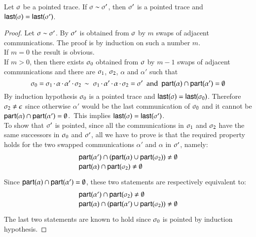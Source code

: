 \begin{lemma}
Let $\sigma$ be a pointed  trace.  If  $\sigma \sim \sigma'$, then $\sigma'$ is a
 pointed  trace   and ${\sf last}(\sigma)={\sf last}(\sigma')$.  
\end{lemma}
\begin{proof}
  Let $\sigma \sim \sigma'$. By  $\sigma'$ is
  obtained from $\sigma$ by $m$ swaps of adjacent communications. The
  proof is by induction on such a number 
 $m$. \\
  If $m=0$ the result is obvious.\\
  If $m>0$, then there exists $\sigma_0$ obtained from $\sigma$ by
  $m-1$ swaps of adjacent communications and there are  
$\sigma_1$,  $\sigma_2$,  $\alpha$ and $\alpha'$ such that
\[
  \sigma_0 =
    \sigma_1\,{\cdot}\,\alpha\,{\cdot}\,\alpha'\,{\cdot}\,\sigma_2\,\sim\,\,
    \sigma_1\,{\cdot}\,\alpha'\,{\cdot}\,\alpha\,{\cdot}\,\sigma_2
    = \sigma'\ \ \mbox{and}\
    \ {\sf part}(\alpha)\cap{\sf part}(\alpha')=\emptyset
    \]
   By
  induction hypothesis $\sigma_0$ is a pointed  trace  
  and ${\sf last}(\sigma)={\sf last}(\sigma_0)$.  Therefore
  $\sigma_2\neq\epsilon$ since otherwise $\alpha'$ would be the
  last communication of $\sigma_0$ and it cannot be
  ${\sf part}(\alpha)\cap {\sf part}(\alpha')=\emptyset$.\
  This implies ${\sf last}(\sigma)={\sf last}(\sigma')$.\\
  To show that $\sigma'$ is pointed, since all the communications in
  $\sigma_1$ and $\sigma_2$ have the same successors in
  $\sigma_0$ and $\sigma'$, all we have to prove is  that the
  required property holds for the two swapped communications
  $\alpha'$ and $\alpha$ in $\sigma'$, namely:
\[
\begin{array}{l}
 {\sf part}(\alpha')\cap({\sf part}(\alpha)\cup{\sf part}(\sigma_2))\not=\emptyset\\[2pt]
 {\sf part}(\alpha)\cap{\sf part}(\sigma_2)\not=\emptyset\\[2pt]
\end{array}
\]
Since ${\sf part}(\alpha)\cap{\sf part}(\alpha')=\emptyset$, these
two statements are respectively equivalent to:
\[
\begin{array}{l}
{\sf part}(\alpha')\cap{\sf part}(\sigma_2)\not=\emptyset \\[2pt]
{\sf part}(\alpha)\cap({\sf part}(\alpha')\cup{\sf part}(\sigma_2))\not=\emptyset\\[2pt]
\end{array}
\]
The last two statements are known to hold since $\sigma_0$ is pointed
by induction hypothesis.
\end{proof}



